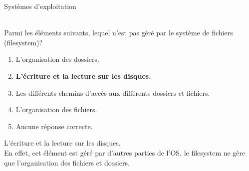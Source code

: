 \begin{section}{Systèmes d'exploitation}
\begin{comment}
        \begin{Exercice}[5 minutes]
        Quel(s) lien(s) fait le système d'exploitation? Plusieurs réponses sont possibles
        \begin{enumerate}
            \item \textbf{Entre les applications et internet.}
            \item \textbf{Entre la souris et l'écran.}
            \item Le disque dur et le processeur
            \item Aucune réponse n'est correcte.
        \end{enumerate}
        \begin{solution}
            Le système d'exploitation fait des liens abstraits. Or le lien entre le disque dur et le processeur est un lien physique car ce sont tous les deux du hardware.
	    De plus, le système d'exploitation est résponsable des tous les périphériques ainsi que toutes les connexions. 
        \end{solution}
        \begin{conseil}
            Réfléchir à la nature de la connexion entre chaque objet de chaque proposition. 
	    Internet ici est considérer comme software et non son application physique. 
        \end{conseil}
    \end{Exercice}
\end{comment}

    
    
     \begin{Exercice}[5 minutes]\\
    Parmi les éléments suivants, lequel n'est pas géré par le système de fichiers (filesystem)?
        \begin{enumerate}
            \item L'organisation des dossiers.
            \item \textbf{L'écriture et la lecture sur les disques.}
            \item Les différents chemins d'accès aux différents dossiers et fichiers.
            \item L'organisation des fichiers.
            \item Aucune réponse correcte.
        \end{enumerate}
    \end{Exercice}
    
    \begin{solution}
        L'écriture et la lecture sur les disques. \\
	
	En effet, cet élément est géré par d'autres parties de l'OS, le filesystem ne gère que l'organisation des fichiers et dossiers. \\ 
    \end{solution}
    
\end{section}
